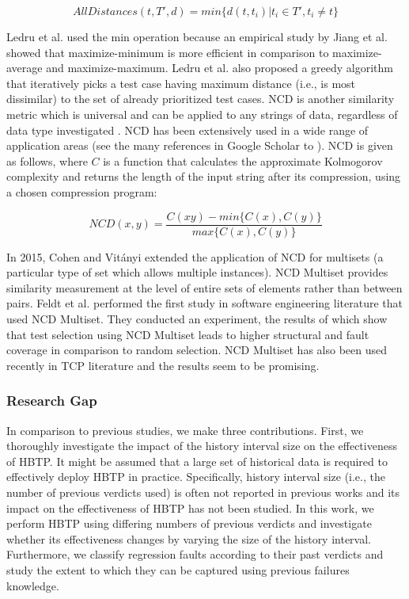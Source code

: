 \documentclass[1p]{elsarticle}
\begin{document}
$$AllDistances(t, T', d) = min \{d(t, t_i)| t_i \in T', t_i \neq t\} $$

Ledru et al. used the min operation because an empirical study by Jiang et al. \cite{jiang2009adaptive} showed that maximize-minimum is more efficient in comparison to maximize-average and maximize-maximum. Ledru et al. also proposed a greedy algorithm that iteratively picks a test case having maximum distance (i.e., is most dissimilar) to the set of already prioritized test cases. NCD is another similarity metric which is universal and can be applied to any strings of data, regardless of data type investigated \cite{li2004similarity,cilibrasi2005clustering}. NCD has been extensively used in a wide range of application areas (see the many references in Google Scholar to \cite{li2004similarity,cilibrasi2005clustering}). NCD is given as follows, where $C$ is a function that calculates the approximate Kolmogorov complexity and returns the length of the input string after its compression, using a chosen compression program:

$$NCD(x,y) = \frac{ C(xy) - min \{C(x), C(y)\}} { max \{C(x), C(y)\} } $$

In 2015, Cohen and Vit\'anyi \cite{cohen2015normalized} extended the application of NCD for multisets (a particular type of set which allows multiple instances). NCD Multiset provides similarity measurement at the level of entire sets of elements rather than between pairs. Feldt et al. \cite{feldt2016test} performed the first study in software engineering literature that used NCD Multiset. They conducted an experiment, the results of which show that test selection using NCD Multiset leads to higher structural and fault coverage in comparison to random selection. NCD Multiset has also been used recently in TCP literature \cite{henard2016comparing} and the results seem to be promising.


\label{section_researchgap}
\subsubsection{Research Gap}
In comparison to previous studies, we make three contributions. First, we thoroughly investigate the impact of the history interval size on the effectiveness of HBTP. It might be assumed that a large set of historical data is required to effectively deploy HBTP in practice. Specifically, history interval size (i.e., the number of previous verdicts used) is often not reported in previous works and its impact on the effectiveness of HBTP has not been studied. In this work, we perform HBTP using differing numbers of previous verdicts and investigate whether its effectiveness changes by varying the size of the history interval. Furthermore, we classify regression faults according to their past verdicts and study the extent to which they can be captured using previous failures knowledge.
 
\end{document}
